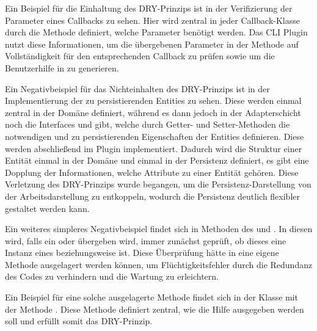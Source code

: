 Ein Beispiel für die Einhaltung des DRY-Prinzips ist in der Verifizierung der Parameter eines Callbacks zu sehen. Hier wird zentral in jeder Callback-Klasse durch die Methode  definiert, welche Parameter benötigt werden. Das CLI Plugin nutzt diese Informationen, um die übergebenen Parameter in der Methode  auf Vollständigkeit für den entsprechenden Callback zu prüfen sowie um die Benutzerhilfe in  zu generieren.

Ein Negativbeispiel für das Nichteinhalten des DRY-Prinzips ist in der Implementierung der zu persistierenden Entities zu sehen. Diese werden einmal zentral in der Domäne definiert, während es dann jedoch in der Adapterschicht noch die Interfaces  und  gibt, welche durch Getter- und Setter-Methoden die notwendigen und zu persistierenden Eigenschaften der Entities definieren. Diese werden abschließend im  Plugin implementiert. Dadurch wird die Struktur einer Entität einmal in der Domäne und einmal in der Persistenz definiert, es gibt eine Dopplung der Informationen, welche Attribute zu einer Entität gehören. Diese Verletzung des DRY-Prinzips wurde begangen, um die Persistenz-Darstellung von der Arbeitsdarstellung zu entkoppeln, wodurch die Persistenz deutlich flexibler gestaltet werden kann.

Ein weiteres simpleres Negativbeispiel findet sich in Methoden des  und . In diesen wird, falls ein  oder  übergeben wird, immer zunächst geprüft, ob dieses eine Instanz eines  beziehungsweise  ist. Diese Überprüfung hätte in eine eigene Methode ausgelagert werden können, um Flüchtigkeitsfehler durch die Redundanz des Codes zu verhindern und die Wartung zu erleichtern.

Ein Beispiel für eine solche ausgelagerte Methode findet sich in der Klasse  mit der Methode . Diese Methode definiert zentral, wie die Hilfe ausgegeben werden soll und erfüllt somit das DRY-Prinzip.
